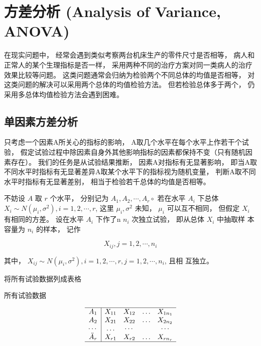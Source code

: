 \section{方差分析 (Analysis of Variance, ANOVA)}

在现实问题中， 经常会遇到类似考察两台机床生产的零件尺寸是否相等， 病人和正常人的某个生理指标是否一样， 采用两种不同的治疗方案对同一类病人的治疗效果比较等问题。 这类问题通常会归纳为检验两个不同总体的均值是否相等， 对这类问题的解决可以采用两个总体的均值检验方法。 但若检验总体多于两个， 仍采用多总体均值检验方法会遇到困难。 

\subsection{单因素方差分析}

只考虑一个因素A所关心的指标的影响， A取几个水平在每个水平上作若干个试验， 假定试验过程中除因素自身外其他影响指标的因素都保持不变（只有随机因素存在）。 我们的任务是从试验结果推断， 因素A对指标有无显著影响， 即当A取不同水平时指标有无显著差异A取某个水平下的指标视为随机变量， 判断A取不同水平时指标有无显著差别， 相当于检验若千总体的均值是否相等。 

不妨设 $A$ 取 $r$ 个水平， 分别记为 $A_{1}, A_{2}, \cdots, A_{r} \circ$ 若在水平 $A_{i}$ 下总体 $X_{i} \sim N\left(\mu_{i}, \sigma^{2}\right), i=1,2, \cdots, r$, 这里 $\mu_{i}, \sigma^{2}$ 未知， $\mu_{i}$ 可以互不相同， 但假定 $X_{i}$ 有相同的方差。  设在水平 $A_{i}$ 下作了n $n_{i}$ 次独立试验， 即从总体 $X_{i}$ 中抽取样 本容量为 $n_{i}$ 的样本， 记作

\begin{equation}
X_{i j}, j=1,2, \cdots, n_{i}
\end{equation}

其中， $X_{i j} \sim N\left(\mu_{i}, \sigma^{2}\right), i=1,2, \cdots, r, j=1,2, \cdots, n_{i}$, 且相
互独立。 

将所有试验数据列成表格

\begin{table}
\caption{所有试验数据}
      \label{tab:anovaData}
\begin{equation}\begin{array}{c|cccc}
    \hline A_{1} & X_{11} & X_{12} & \ldots & X_{1 n_{1}} \\
    A_{2} & X_{21} & X_{22} & \ldots & X_{2 n_{2}} \\
    \cdots & \ldots & \cdots & & \cdots \\
    \ddot{A}_{r} & X_{r 1} & X_{r 2} & \ldots & X_{r n_{r}} \\
    \hline
    \end{array}
\end{equation}  
\end{table}


